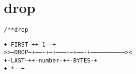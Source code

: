 \section{drop}
\begin{shaded}
\begin{alltt}
/** drop

            +-FIRST-+  +-1------+
  >>--DROP--+-------+--+--------+--+-------+-----------------------------><
            +-LAST--+  +-number-+  +-BYTES-+
                       +-*------+
\end{alltt}
\end{shaded}
